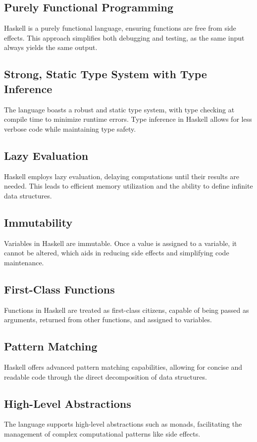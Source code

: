 \documentclass[a4paper, 10pt]{article}
\begin{document}
        \subsection{Purely Functional Programming}
            Haskell is a purely functional language, ensuring functions are free from side effects. This approach simplifies both debugging and testing, as the same input always yields the same output.

        \subsection{Strong, Static Type System with Type Inference}
            The language boasts a robust and static type system, with type checking at compile time to minimize runtime errors. Type inference in Haskell allows for less verbose code while maintaining type safety.

        \subsection{Lazy Evaluation}
            Haskell employs lazy evaluation, delaying computations until their results are needed. This leads to efficient memory utilization and the ability to define infinite data structures.

        \subsection{Immutability}
            Variables in Haskell are immutable. Once a value is assigned to a variable, it cannot be altered, which aids in reducing side effects and simplifying code maintenance.

        \subsection{First-Class Functions}
            Functions in Haskell are treated as first-class citizens, capable of being passed as arguments, returned from other functions, and assigned to variables.

        \subsection{Pattern Matching}
            Haskell offers advanced pattern matching capabilities, allowing for concise and readable code through the direct decomposition of data structures.

        \subsection{High-Level Abstractions}
            The language supports high-level abstractions such as monads, facilitating the management of complex computational patterns like side effects.
\end{document}
